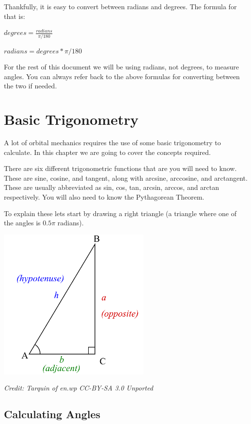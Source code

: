 \documentclass[]{book}
\begin{document}
Thankfully, it is easy to convert between radians and degrees. The formula
for that is:

\bigskip
$degrees = \frac{radians}{\pi/180}$

\bigskip
$radians = degrees*\pi/180$
\bigskip

For the rest of this document we will be using radians, not degrees, to
measure angles. You can always refer back to the above formulas for
converting between the two if needed.

\chapter{Basic Trigonometry}

A lot of orbital mechanics requires the use of some basic trigonometry to
calculate.  In this chapter we are going to cover the concepts required.

There are six different trigonometric functions that are you will need to
know.  These are sine, cosine, and tangent, along with arcsine, arccosine,
and arctangent.  These are usually abbreviated as sin, cos, tan, arcsin,
arccos, and arctan respectively. You will also need to know the Pythagorean Theorem.

To explain these lets start by drawing a right triangle (a triangle where
one of the angles is $0.5\pi$ radians).

\bigskip
\includegraphics[width=3in]{images/Trigonometry_triangle}

\textit{Credit: Tarquin of en.wp CC-BY-SA 3.0 Unported}
\bigskip

\section{Calculating Angles}
\end{document}
